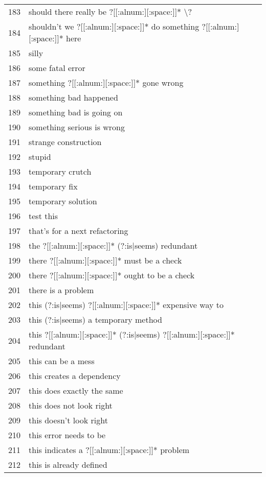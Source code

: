 \begin{longtable}{r|l}
183 & should there really be ?[[:alnum:][:space:]]* \textbackslash{}?\\
184 & shouldn't we ?[[:alnum:][:space:]]* do something ?[[:alnum:][:space:]]* here\\
185 & silly\\
186 & some fatal error\\
187 & something ?[[:alnum:][:space:]]* gone wrong\\
188 & something bad happened\\
189 & something bad is going on\\
190 & something serious is wrong\\
191 & strange construction\\
192 & stupid\\
193 & temporary crutch\\
194 & temporary fix\\
195 & temporary solution\\
196 & test this\\
197 & that's for a next refactoring\\
198 & the ?[[:alnum:][:space:]]* (?:is|seems) redundant\\
199 & there ?[[:alnum:][:space:]]* must be a check\\
200 & there ?[[:alnum:][:space:]]* ought to be a check\\
201 & there is a problem\\
202 & this (?:is|seems) ?[[:alnum:][:space:]]* expensive way to\\
203 & this (?:is|seems) a temporary method\\
204 & this ?[[:alnum:][:space:]]* (?:is|seems) ?[[:alnum:][:space:]]* redundant\\
205 & this can be a mess\\
206 & this creates a dependency\\
207 & this does exactly the same\\
208 & this does not look right\\
209 & this doesn't look right\\
210 & this error needs to be\\
211 & this indicates a ?[[:alnum:][:space:]]* problem\\
212 & this is already defined\\

\end{longtable}
